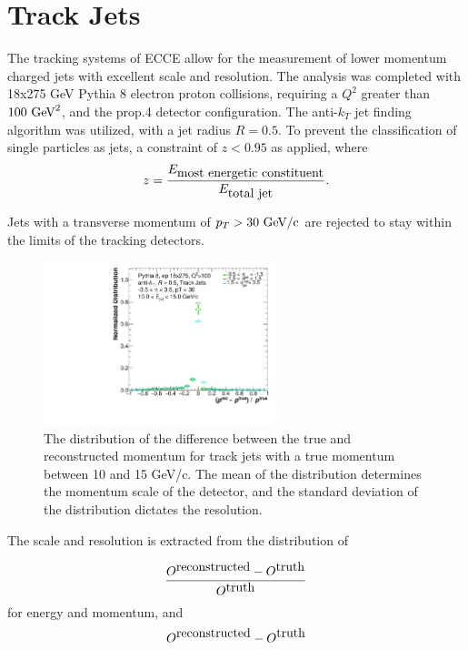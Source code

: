 \section {Track Jets}
\label{section2}

The tracking systems of ECCE allow for the measurement of lower momentum charged jets with excellent scale and resolution.  The analysis was completed with 18x275 GeV Pythia 8 electron proton collisions, requiring a $Q^2$ greater than $100 \hbox{ GeV}^2$, and the prop.4 detector configuration.  The anti-$k_T$ jet finding algorithm was utilized, with a jet radius $R=0.5$.  To prevent the classification of single particles as jets, a constraint of $z<0.95$ as applied, where 
\begin{equation}
z=\frac{E_{\hbox{most energetic constituent}}}{E_{\hbox{total jet}}}.
\label{eq:jet_z}
\end{equation}

Jets with a transverse momentum of $p_T > 30\hbox{ GeV/c}$ are rejected to stay within the limits of the tracking detectors.

\begin{figure}[h]
    \centering
    \includegraphics[width=0.6\textwidth]{figs/JES_Slice_Plot_EtaBins2_grouped.pdf}
    \caption{The distribution of the difference between the true and reconstructed momentum for track jets with a true momentum between 10 and 15 GeV/c.  The mean of the distribution determines the momentum scale of the detector, and the standard deviation of the distribution dictates the resolution.}
    \label{fig:track_momentum_slice}
\end{figure}

The scale and resolution is extracted from the distribution of 

\begin{equation}
    \frac{O^{\hbox{reconstructed}}-O^{\hbox{truth}}}{O^{\hbox{truth}}}
    \label{eq:distribution}
\end{equation}
for energy and momentum, and 
\begin{equation}
    O^{\hbox{reconstructed}}-O^{\hbox{truth}}
    \label{eq:distribution}
\end{equation}

